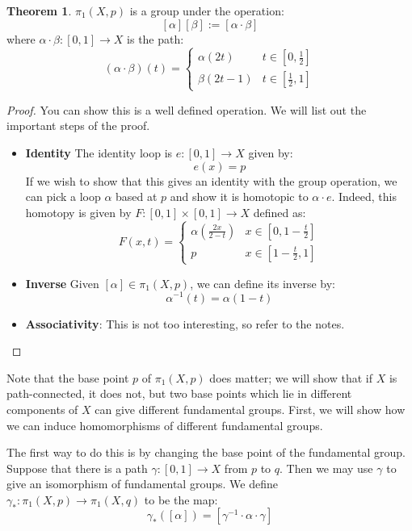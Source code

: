 \documentclass[11pt, oneside]{amsart}   	%
\theoremstyle{definition}
\newtheorem{theorem}{Theorem}[section]
\begin{document}
	\begin{theorem}
		$\pi_1(X, p)$ is a group under the operation:
		$$
			[\alpha][\beta] := [\alpha\cdot\beta]
		$$
		where $\alpha\cdot\beta : [0, 1]\rightarrow X$ is the path:
		$$
			(\alpha\cdot\beta)(t) = \begin{cases}
				\alpha(2t) & t\in [0, \frac{1}{2}] \\
				\beta(2t - 1) & t\in [\frac{1}{2}, 1]
			\end{cases}
		$$
	\end{theorem}
	
	\begin{proof}
		You can show this is a well defined operation. We will list out the important steps of the proof.
		\begin{itemize}
			\item \textbf{Identity} The identity loop is $e : [0, 1]\rightarrow X$ given by:
			$$
				e(x) = p
			$$
			If we wish to show that this gives an identity with the group operation, we can pick a loop $\alpha$ based at $p$ and show it is homotopic to $\alpha
			\cdot e$. Indeed, this homotopy is given by $F : [0, 1]\times [0, 1]\rightarrow X$ defined as:
			$$
				F(x, t) = \begin{cases}
					\alpha(\frac{2x}{2 - t}) & x\in [0, 1 - \frac{t}{2}] \\
					p & x\in [1 - \frac{t}{2}, 1]
				\end{cases}
			$$
		
			\item \textbf{Inverse} Given $[\alpha]\in\pi_1(X, p)$, we can define its inverse by:
			$$
				\alpha^{-1}(t) = \alpha(1 - t)
			$$
			
			\item \textbf{Associativity}: This is not too interesting, so refer to the notes.
		\end{itemize}
	\end{proof}
	
	Note that the base point $p$ of $\pi_1(X, p)$ does matter; we will show that if $X$ is path-connected, it does not, but two base points which lie in different 
	components of $X$ can give different fundamental groups. First, we will show how we can induce homomorphisms of different fundamental groups. 
	
	The first way to do this is by changing the base point of the fundamental group. Suppose that there is a path $\gamma : [0, 1]\rightarrow X$ from $p$ to $q$. 
	Then we may use $\gamma$ to give an isomorphism of fundamental groups. We define $\gamma_* : \pi_1(X, p)\rightarrow\pi_1(X, q)$ to be the map:
	$$
		\gamma_*([\alpha]) = [\gamma^{-1}\cdot\alpha\cdot\gamma]
	$$
	
\end{document}
